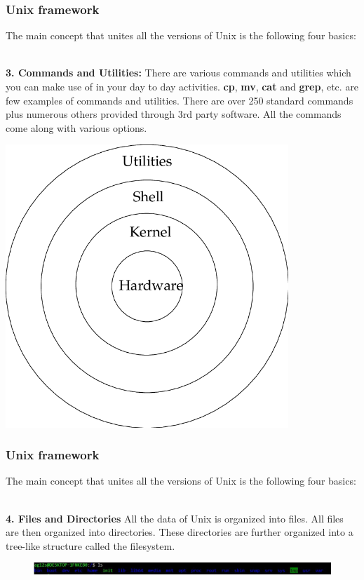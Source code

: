 \documentclass{if-beamer}
\begin{document}
\begin{frame}
\frametitle{Unix framework}
The main concept that unites all the versions of Unix is the following four basics: \\~\

\begin{minipage}{.45\textwidth}
	\textbf{3. Commands and Utilities:} There are various commands and utilities which you can make use of in your day to day activities. \textbf{cp}, \textbf{mv}, \textbf{cat} and \textbf{grep}, etc. are few examples of commands and utilities. There are over 250 standard commands plus numerous others provided through 3rd party software. All the commands come along with various options.
\end{minipage} 
\begin{minipage}{.5\textwidth}
	
	\includegraphics[width=0.8\textwidth]{figures/unix.png}
\end{minipage} 
\end{frame}

\begin{frame}
\frametitle{Unix framework}
The main concept that unites all the versions of Unix is the following four basics: \\~\

\textbf{4. Files and Directories} All the data of Unix is organized into files. All files are then organized into directories. These directories are further organized into a tree-like structure called the filesystem. 

\begin{figure}
	\centering
	\includegraphics[width=\textwidth]{figures/files.jpg}
\end{figure}

\end{frame}
\end{document}
